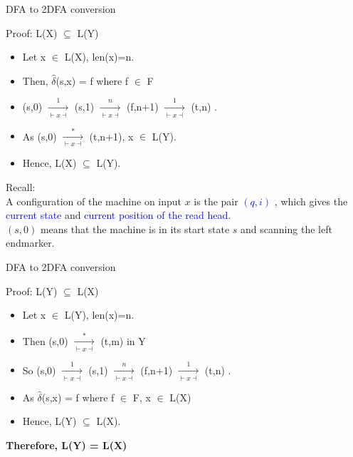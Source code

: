 \documentclass{beamer}
\newcommand{\deltahat}{\ensuremath{\widehat{\delta}}}
\begin{document}
\begin{frame}{DFA to 2DFA conversion}
  \begin{block}{Proof: L(X) $\subseteq$ L(Y)}
  \begin{itemize}
    \item Let x $\in$ L(X), len(x)=n. \\
    \item Then, $\deltahat$(s,x) = f where f $\in$ F \\
    \item (s,0) $\xrightarrow[\vdash x \dashv]{1}$ (s,1) $\xrightarrow[\vdash x \dashv]{n}$ (f,n+1) $\xrightarrow[\vdash x \dashv]{1}$ (t,n) .\\
    \item As (s,0) $\xrightarrow[\vdash x \dashv]{*}$ (t,n+1), x $\in$ L(Y).\\
    \item Hence, L(X) $\subseteq$ L(Y).\\
  \end{itemize}
  \end{block}
  Recall: \\
  A configuration of the machine on input $x$ is the pair \textcolor{blue}{$(q, i)$} , which gives the \textcolor{blue}{current state} and \textcolor{blue}{current position of the read head}. \\
  $(s, 0)$ means that the machine is in its start state $s$ and scanning the left endmarker.
  
\end{frame}

\begin{frame}{DFA to 2DFA conversion}
  \begin{block}{Proof: L(Y) $\subseteq$ L(X)}
  \begin{itemize}
    \item Let x $\in$ L(Y), len(x)=n. \\
    \item Then (s,0) $\xrightarrow[\vdash x \dashv]{*}$ (t,m) in Y\\
    \item So (s,0) $\xrightarrow[\vdash x \dashv]{1}$ (s,1) $\xrightarrow[\vdash x \dashv]{n}$ (f,n+1) $\xrightarrow[\vdash x \dashv]{1}$ (t,n) .\\
    \item As $\deltahat$(s,x) = f where f $\in$ F, x $\in$ L(X)\\
    
    \item Hence, L(Y) $\subseteq$ L(X).\\
  \end{itemize}
  \end{block}
   \textbf{Therefore, L(Y) = L(X)}
\end{frame}
\end{document}

